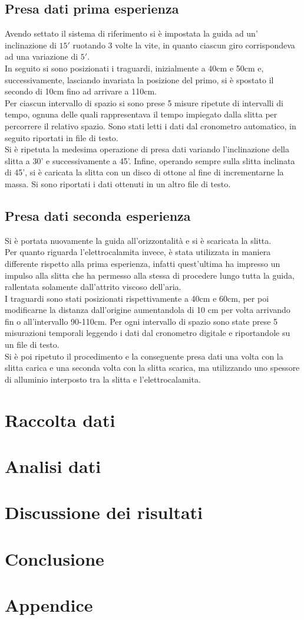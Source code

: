 \documentclass[a4paper,11pt,oneside]{article}
\begin{document}
\subsection{Presa dati prima esperienza}
Avendo settato il sistema di riferimento si è impostata la guida ad un' inclinazione di $15'$ ruotando 3 volte la vite, in quanto ciascun giro corrispondeva ad una variazione  di $5'$.\\

In seguito si sono posizionati i traguardi, inizialmente a 40cm e 50cm e, successivamente, lasciando invariata la posizione del primo, si è spostato il secondo di 10cm fino ad arrivare a 110cm. \\
Per ciascun intervallo di spazio si sono prese 5 misure ripetute di intervalli di tempo, ognuna delle quali rappresentava il tempo impiegato dalla slitta per percorrere il relativo spazio. Sono stati letti i dati dal cronometro automatico, in seguito riportati in file di testo.\\
Si è ripetuta la medesima operazione di presa dati variando l'inclinazione della slitta a 30' e successivamente a 45'.
Infine, operando sempre sulla slitta inclinata di 45', si è caricata la slitta con un disco di ottone al fine di incrementarne la massa. Si sono riportati i dati ottenuti in un altro file di testo.

\subsection{Presa dati seconda esperienza}
Si è portata nuovamente la guida all'orizzontalità e si è scaricata la slitta. \\
Per quanto riguarda l'elettrocalamita invece, è stata utilizzata in maniera differente rispetto alla prima esperienza, infatti quest'ultima ha impresso un impulso alla slitta che ha permesso alla stessa di procedere lungo tutta la guida, rallentata solamente dall'attrito viscoso dell'aria.\\
I traguardi sono stati posizionati rispettivamente a 40cm e 60cm, per poi modificarne la distanza dall'origine aumentandola di 10 cm per volta arrivando fin o all'intervallo 90-110cm.
Per ogni intervallo di spazio sono state prese 5 misurazioni temporali leggendo i dati dal cronometro digitale e riportandole su un file di testo.\\
Si è poi ripetuto il procedimento e la conseguente presa dati una volta con la slitta carica e una seconda volta con la slitta scarica, ma utilizzando uno spessore di alluminio interposto tra la slitta e l'elettrocalamita.



\section{Raccolta dati}
\section{Analisi dati}
\section{Discussione dei risultati}
\section{Conclusione}
\section{Appendice}
\newpage
\end{document}
